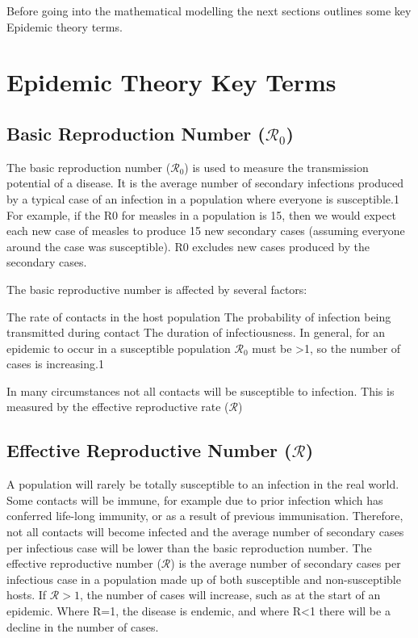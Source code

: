 \documentclass[fontsize=17pt]{article}
\begin{document}
Before going into the mathematical modelling the next sections outlines some key Epidemic theory terms.
\section {Epidemic Theory Key Terms}

\subsection{Basic Reproduction Number ($\mathscr{R}_{0}$)}

The basic reproduction number ($\mathscr{R}_{0}$) is used to measure the transmission potential of a disease. It is the average number of secondary infections produced by a typical case of an infection in a population where everyone is susceptible.1 For example, if the R0 for measles in a population is 15, then we would expect each new case of measles to produce 15 new secondary cases (assuming everyone around the case was susceptible). R0 excludes new cases produced by the secondary cases.

The basic reproductive number is affected by several factors:

The rate of contacts in the host population
The probability of infection being transmitted during contact
The duration of infectiousness.
In general, for an epidemic to occur in a susceptible population $\mathscr{R}_{0}$ must be >1, so the number of cases is increasing.1

In many circumstances not all contacts will be susceptible to infection. This is measured by the effective reproductive rate ($\mathscr{R}$)


\subsection{Effective Reproductive Number ($\mathscr{R}$)}

A population will rarely be totally susceptible to an infection in the real world. Some contacts will be immune, for example due to prior infection which has conferred life-long immunity, or as a result of previous immunisation. Therefore, not all contacts will become infected and the average number of secondary cases per infectious case will be lower than the basic reproduction number. The effective reproductive number ($\mathscr{R}$) is the average number of secondary cases per infectious case in a population made up of both susceptible and non-susceptible hosts. If $\mathscr{R}>1$, the number of cases will increase, such as at the start of an epidemic. Where R=1, the disease is endemic, and where R<1 there will be a decline in the number of cases.
\end{document}

